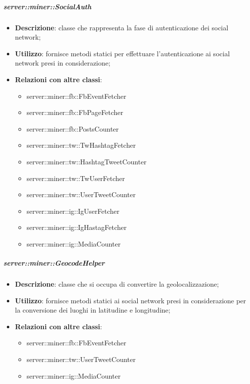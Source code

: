 		\subparagraph{server::miner::SocialAuth} %
		\label{subp:server_miner_SocialAuth}
				\begin{itemize}
				\item \textbf{Descrizione}: classe che rappresenta la fase di autenticazione dei social network;
				\item \textbf{Utilizzo}: fornisce metodi statici per effettuare l'autenticazione ai social network presi in considerazione;
				\item \textbf{Relazioni con altre classi}:
					\begin{itemize}
						\item server::miner::fb::FbEventFetcher
						\item server::miner::fb::FbPageFetcher
						\item server::miner::fb::PostsCounter
						\item server::miner::tw::TwHashtagFetcher
						\item server::miner::tw::HashtagTweetCounter
						\item server::miner::tw::TwUserFetcher
						\item server::miner::tw::UserTweetCounter
						\item server::miner::ig::IgUserFetcher
						\item server::miner::ig::IgHastagFetcher
						\item server::miner::ig::MediaCounter
					\end{itemize}
			\end{itemize}

		\subparagraph{server::miner::GeocodeHelper} %
		\label{subp:server_miner_GeocodeHelper}
				\begin{itemize}
				\item \textbf{Descrizione}: classe che si occupa di convertire la geolocalizzazione;
				\item \textbf{Utilizzo}: fornisce metodi statici ai social network presi in considerazione per la conversione dei luoghi in latitudine e longitudine;
				\item \textbf{Relazioni con altre classi}:
					\begin{itemize}
						\item server::miner::fb::FbEventFetcher
						\item server::miner::tw::UserTweetCounter
						\item server::miner::ig::MediaCounter
					\end{itemize}
			\end{itemize}

